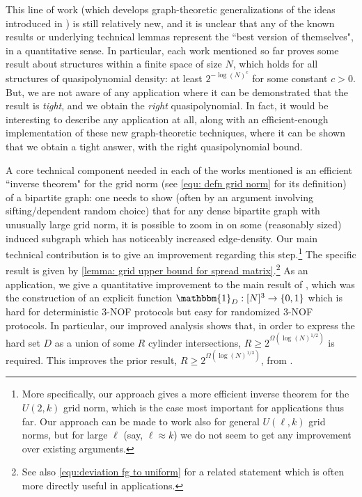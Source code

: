 \documentclass[11pt]{article}
\newcommand{\1}{ \mathbbm{1}}
\newcommand{\bits}{\{0,1\}}
\begin{document}
This line of work (which develops graph-theoretic generalizations of the ideas introduced in \cite{KelleyM2023strong}) is still relatively new, and it is unclear that any of the known results or underlying technical lemmas represent the ``best version of themselves", in a quantitative sense. In particular, each work mentioned so far proves some result about structures within a finite space of size $N$, which holds for all structures of quasipolynomial density: at least $2^{-\log(N)^c}$ for some constant $c > 0$. But, we are not aware of any application where it can be demonstrated that the result is \textit{tight}, and we obtain the \textit{right} quasipolynomial. 
In fact, it would be interesting to describe any application at all, along with an efficient-enough implementation of these new graph-theoretic techniques, where it can be shown that we obtain a tight answer, with the right quasipolynomial bound.

A core technical component needed in each of the works mentioned is an efficient ``inverse theorem" for the grid norm (see \eqref{equ: defn grid norm} for its definition) of a bipartite graph: one needs to show (often by an argument involving sifting/dependent random choice) that for any dense bipartite graph with unusually large grid norm, it is possible to zoom in on some (reasonably sized) induced subgraph which has noticeably increased edge-density.
Our main technical contribution is to give an improvement regarding this step.\footnote{More specifically, our approach gives a more efficient inverse theorem for the $U(2,k)$ grid norm, which is the case most important for applications thus far. Our approach can be made to work also for general $U(\ell,k)$ grid norms, but for large $\ell$ (say, $\ell \approx k$) we do not seem to get any improvement over existing arguments.}  The specific result is given by \cref{lemma: grid upper bound for spread matrix}.\footnote{See also \cref{equ:deviation fg to uniform} for a related statement which is often more directly useful in applications. } 
As an application, we give a quantitative improvement to the main result of \cite{KelleyLM2024-nof}, which was the construction of an explicit function $\1_{D} : [N]^3 \rightarrow \bits$ which is hard for deterministic 3-NOF protocols but easy for randomized 3-NOF protocols. In particular, 
our improved analysis shows that, in order to express the hard set $D$ as a union of some $R$ cylinder intersections, $R \geq 2^{\Omega(\log(N)^{1/2})}$ is required. 
This improves the prior result, $R \geq 2^{\Omega(\log(N)^{1/3})}$, from \cite{KelleyLM2024-nof}.
\end{document}
